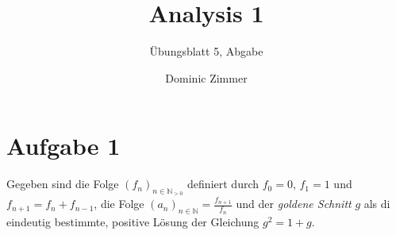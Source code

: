\documentclass{scrreprt}
\newcommand{\NN}{\mathbb{N}}
\begin{document}
	\title{Analysis 1}
 	\author{Dominic Zimmer}
 	\subtitle{Übungsblatt 5, Abgabe}
 	\publishers{Übungsgruppe: Rami Ahmad}
  	\maketitle 


	\section*{Aufgabe 1}
	Gegeben sind die Folge $(f_n)_{n \in \NN_{>0}}$ definiert durch $f_0 = 0$, $f_1= 1$ und $f_{n+1} = f_n + f_{n-1}$, die Folge $(a_n)_{n \in \NN} = \frac{f_{n+1}}{f_n}$ und der \emph{goldene Schnitt} $g$ als di eindeutig bestimmte, positive Lösung der Gleichung $g^2 = 1+g$.
\end{document}
